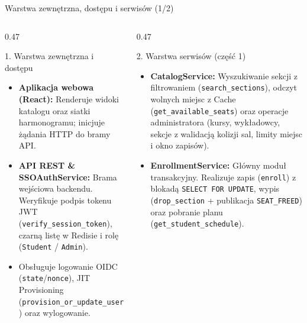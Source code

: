 \documentclass[aspectratio=169, 10pt, xcolor=table]{beamer}
\begin{document}
\begin{frame}{Warstwa zewnętrzna, dostępu i serwisów (1/2)}
    \footnotesize
    \begin{columns}[T, onlytextwidth]
        \begin{column}{0.47\textwidth}
            \begin{block}{1. Warstwa zewnętrzna i dostępu}
                \begin{itemize}
                    \item \textbf{Aplikacja webowa (React):} Renderuje widoki katalogu oraz siatki harmonogramu; inicjuje żądania HTTP do bramy API.
                    \item \textbf{API REST \& SSOAuthService:} Brama wejściowa backendu. Weryfikuje podpis tokenu JWT (\texttt{verify\_session\_token}), czarną listę w Redisie i rolę (\texttt{Student} / \texttt{Admin}).
                    \item Obsługuje logowanie OIDC (\texttt{state}/\texttt{nonce}), JIT Provisioning (\texttt{provision\_or\_update\_user}) oraz wylogowanie.
                \end{itemize}
            \end{block}
        \end{column}
        \begin{column}{0.47\textwidth}
            \begin{exampleblock}{2. Warstwa serwisów (część 1)}
                \begin{itemize}
                    \item \textbf{CatalogService:} Wyszukiwanie sekcji z filtrowaniem (\texttt{search\_sections}), odczyt wolnych miejsc z Cache (\texttt{get\_available\_seats}) oraz operacje administratora (kursy, wykładowcy, sekcje z walidacją kolizji sal, limity miejsc i okno zapisów).
                    \item \textbf{EnrollmentService:} Główny moduł transakcyjny. Realizuje zapis (\texttt{enroll}) z blokadą \texttt{SELECT FOR UPDATE}, wypis (\texttt{drop\_section} + publikacja \texttt{SEAT\_FREED}) oraz pobranie planu (\texttt{get\_student\_schedule}).
                \end{itemize}
            \end{exampleblock}
        \end{column}
    \end{columns}
\end{frame}
\end{document}

